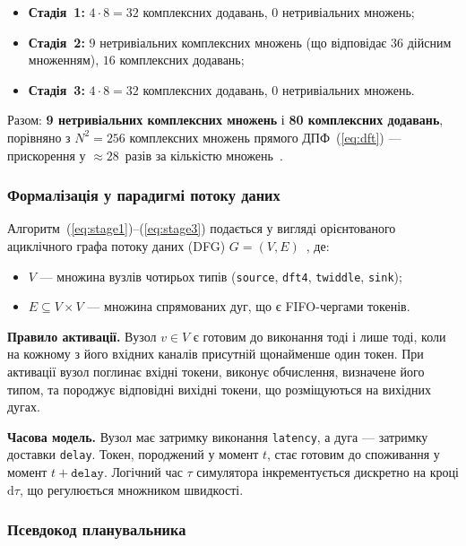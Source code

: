 \begin{itemize}
  \item \textbf{Стадія~1:} $4 \cdot 8 = 32$ комплексних додавань, $0$
        нетривіальних множень;
  \item \textbf{Стадія~2:} $9$ нетривіальних комплексних множень
        (що відповідає $36$ дійсним множенням), $16$ комплексних
        додавань;
  \item \textbf{Стадія~3:} $4 \cdot 8 = 32$ комплексних додавань, $0$
        нетривіальних множень.
\end{itemize}

Разом: \textbf{9 нетривіальних комплексних множень} і
\textbf{80 комплексних додавань}, порівняно з $N^2 = 256$ комплексних
множень прямого ДПФ~(\ref{eq:dft}) --- прискорення у
$\approx 28$~разів за кількістю множень~\cite{nussbaumer1982,burrus1985dft}.

\subsubsection*{Формалізація у парадигмі потоку даних}

Алгоритм~(\ref{eq:stage1})--(\ref{eq:stage3}) подається у вигляді
орієнтованого ациклічного графа потоку даних (DFG)
$G = (V, E)$~\cite{dennis1974,veen1986,lee1994}, де:

\begin{itemize}
  \item $V$ --- множина вузлів чотирьох типів
        (\texttt{source}, \texttt{dft4}, \texttt{twiddle}, \texttt{sink});
  \item $E \subseteq V \times V$ --- множина спрямованих дуг, що
        є FIFO-чергами токенів.
\end{itemize}

\textbf{Правило активації.} Вузол $v \in V$ є готовим до виконання
тоді і лише тоді, коли на кожному з його вхідних каналів присутній
щонайменше один токен. При активації вузол поглинає вхідні токени,
виконує обчислення, визначене його типом, та породжує відповідні
вихідні токени, що розміщуються на вихідних дугах.

\textbf{Часова модель.} Вузол має затримку виконання \texttt{latency},
а дуга --- затримку доставки \texttt{delay}. Токен, породжений у
момент $t$, стає готовим до споживання у момент $t + \texttt{delay}$.
Логічний час $\tau$ симулятора інкрементується дискретно на кроці
$\mathrm{d}\tau$, що регулюється множником швидкості.

\subsubsection*{Псевдокод планувальника}

